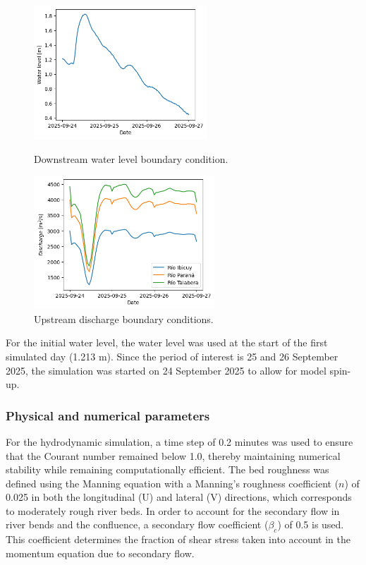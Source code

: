 \begin{figure}[H]
    \centering
    \begin{minipage}[t]{0.48\linewidth}
        \centering
        \includegraphics[height=5cm]{figures/ch7/Downstream_bc.png}
        \caption{Downstream water level boundary condition.}
        \label{fig: Downstream bc}
    \end{minipage}
    \hfill
    \begin{minipage}[t]{0.48\linewidth}
        \centering
        \includegraphics[height=5cm]{figures/ch7/Upstream_bc.png}
        \caption{Upstream discharge boundary conditions.}
        \label{fig: Upstream bc}
    \end{minipage}
\end{figure}

\newpage
For the initial water level, the water level was used at the start of the first simulated day (1.213 m). Since the period of interest is 25 and 26 September 2025, the simulation was started on 24 September 2025 to allow for model spin-up.

\subsubsection{Physical and numerical parameters}
For the hydrodynamic simulation, a time step of 0.2 minutes was used to ensure that the Courant number remained below 1.0, thereby maintaining numerical stability while remaining computationally efficient. The bed roughness was defined using the Manning equation with a Manning's roughness coefficient ($n$) of 0.025 in both the longitudinal (U) and lateral (V) directions, which corresponds to moderately rough river beds. In order to account for the secondary flow in river bends and the confluence, a secondary flow coefficient ($\beta_c$) of 0.5 is used. This coefficient determines the fraction of shear stress taken into account in the momentum equation due to secondary flow. 


